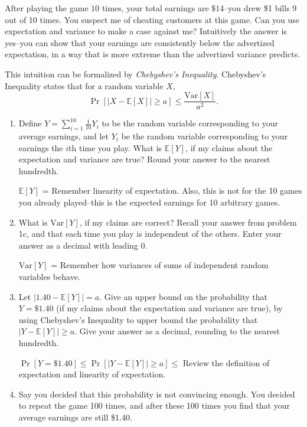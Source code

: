 \documentclass[11pt,preview]{standalone} %
\newcommand{\E}{\mathbb{E}}
\newcommand{\Var}{\text{Var}}
\begin{document}
\begin{enumerate}
\begin{enumerate}
After playing the game $10$ times, your total earnings are $\$14$--you drew \$1 bills 9 out of 10 times. You suspect me of cheating customers at this game. Can you use expectation and variance to make a case against me? Intuitively the answer is yes--you can show that your earnings are consistently below the advertized expectation, in a way that is more extreme than the advertized variance predicts. 

This intuition can be formalized by \emph{Chebyshev's Inequality}. Chebyshev's Inequality states that for a random variable $X$, 
\[
\Pr[ |X - \E[X]| \ge a] \le \frac{\Var[X]}{a^2}.
\] 
\begin{enumerate}
\item Define $Y = \sum_{i=1}^{10}{\frac{1}{10}Y_i}$ to be the random variable corresponding to your average earnings, and let $Y_i$ be the random variable corresponding to your earnings the $i$th time you play. What is $\E[Y]$, if my claims about the expectation and variance are true? Round your answer to the nearest hundredth.
\begin{Freeform}{3.00}
$\E[Y]$ =  
\Hint Remember linearity of expectation. Also, this is not for the 10 games you already played--this is the expected earnings for 10 arbitrary games.
\end{Freeform}
\item What is $\Var[Y]$, if my claims are correct? Recall your answer from problem 1c, and that each time you play is independent of the others. Enter your answer as a decimal with leading 0.
\begin{Freeform}{0.3}
$\Var[Y]$ =  
\Hint Remember how variances of sums of independent random variables behave.
\end{Freeform}
\item Let $|1.40- \E[Y]| = a$. Give an upper bound on the probability that $Y = \$1.40$  (if my claims about the expectation and variance are true), by using Chebyshev's Inequality to upper bound the probability that $|Y - \E[Y]| \ge a$. Give your answer as a decimal, rounding to the nearest hundredth.
\begin{Freeform}{0.12}
$\Pr[Y = \$1.40] \le \Pr[|Y - \E[Y]| \ge a] \le $  
\Hint Review the definition of expectation and linearity of expectation.
\end{Freeform}
\item Say you decided that this probability is not convincing enough. You decided to repeat the game 100 times, and after these 100 times you find that your average earnings are still \$1.40.


\end{enumerate}
\end{enumerate}
\end{enumerate}
\end{document}
